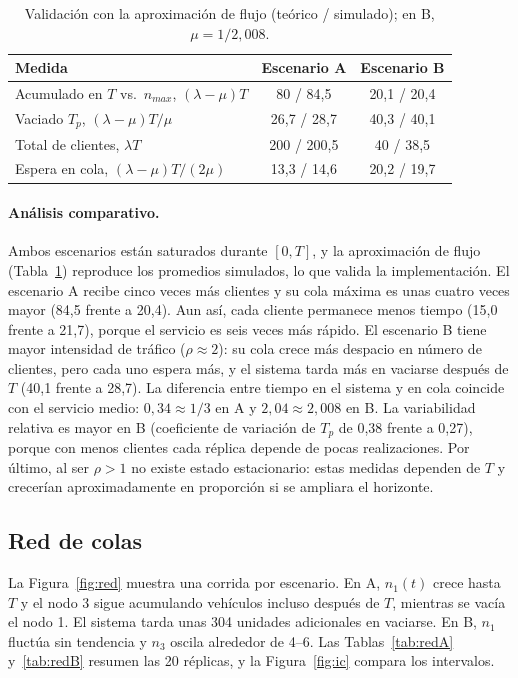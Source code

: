 \documentclass[11pt,a4paper]{article}
\begin{document}
\begin{table}[H]\centering
\caption{Validación con la aproximación de flujo (teórico / simulado); en B,
$\mu=1/2{,}008$.}\label{tab:flujo}
\begin{tabular}{lcc}\toprule
\textbf{Medida}&\textbf{Escenario A}&\textbf{Escenario B}\\\midrule
Acumulado en $T$ vs.\ $n_{max}$, $(\lambda-\mu)T$&80 / 84,5&20,1 / 20,4\\
Vaciado $T_p$, $(\lambda-\mu)T/\mu$&26,7 / 28,7&40,3 / 40,1\\
Total de clientes, $\lambda T$&200 / 200,5&40 / 38,5\\
Espera en cola, $(\lambda-\mu)T/(2\mu)$&13,3 / 14,6&20,2 / 19,7\\\bottomrule
\end{tabular}\end{table}

\paragraph{Análisis comparativo.} Ambos escenarios están saturados durante $[0,T]$, y la
aproximación de flujo (Tabla~\ref{tab:flujo}) reproduce los promedios simulados, lo que
valida la implementación. El escenario A recibe cinco veces más clientes y su cola máxima es
unas cuatro veces mayor (84,5 frente a 20,4). Aun así, cada cliente permanece menos tiempo
(15,0 frente a 21,7), porque el servicio es seis veces más rápido. El escenario B tiene
mayor intensidad de tráfico ($\rho\approx2$): su cola crece más despacio en número de
clientes, pero cada uno espera más, y el sistema tarda más en vaciarse después de $T$
(40,1 frente a 28,7). La diferencia entre tiempo en el sistema y en cola coincide con el
servicio medio: $0{,}34\approx1/3$ en A y $2{,}04\approx2{,}008$ en B. La variabilidad
relativa es mayor en B (coeficiente de variación de $T_p$ de 0,38 frente a 0,27), porque con
menos clientes cada réplica depende de pocas realizaciones. Por último, al ser $\rho>1$ no
existe estado estacionario: estas medidas dependen de $T$ y crecerían aproximadamente en
proporción si se ampliara el horizonte.

\subsection{Red de colas}
La Figura~\ref{fig:red} muestra una corrida por escenario. En A, $n_1(t)$ crece hasta
$T$ y el nodo 3 sigue acumulando vehículos incluso después de $T$, mientras se vacía el
nodo 1. El sistema tarda unas 304 unidades adicionales en vaciarse. En B, $n_1$ fluctúa sin
tendencia y $n_3$ oscila alrededor de 4--6. Las Tablas~\ref{tab:redA} y~\ref{tab:redB}
resumen las 20 réplicas, y la Figura~\ref{fig:ic} compara los intervalos.
\end{document}
